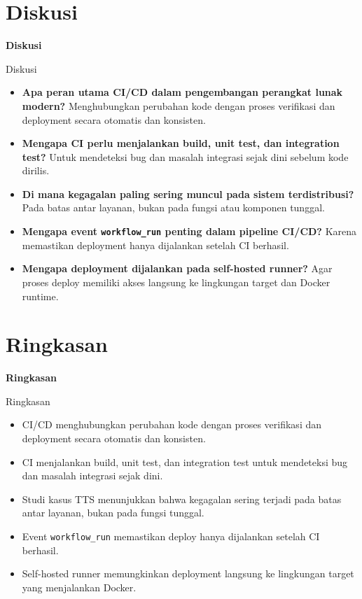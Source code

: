 \documentclass[aspectratio=169, table]{beamer}
\begin{document}
\section{Diskusi}

	\begin{frame}{\hfill}
		\centering
		\Huge{\textbf{Diskusi}}
	\end{frame}

\begin{frame}{Diskusi}
	\vspace{6pt}
	\begin{itemize}
		\item \textbf{Apa peran utama CI/CD dalam pengembangan perangkat lunak modern?}
		      Menghubungkan perubahan kode dengan proses verifikasi dan deployment secara otomatis dan konsisten.
		\item \textbf{Mengapa CI perlu menjalankan build, unit test, dan integration test?}
		      Untuk mendeteksi bug dan masalah integrasi sejak dini sebelum kode dirilis.
		\item \textbf{Di mana kegagalan paling sering muncul pada sistem terdistribusi?}
		      Pada batas antar layanan, bukan pada fungsi atau komponen tunggal.
		\item \textbf{Mengapa event \texttt{workflow\_run} penting dalam pipeline CI/CD?}
		      Karena memastikan deployment hanya dijalankan setelah CI berhasil.
		\item \textbf{Mengapa deployment dijalankan pada self-hosted runner?}
		      Agar proses deploy memiliki akses langsung ke lingkungan target dan Docker runtime.
	\end{itemize}
\end{frame}


\section{Ringkasan}

	\begin{frame}{\hfill}
		\centering
		\Huge{\textbf{Ringkasan}}
	\end{frame}

\begin{frame}{Ringkasan}
	\vspace{6pt}
	\begin{itemize}
		\item CI/CD menghubungkan perubahan kode dengan proses verifikasi dan deployment secara otomatis dan konsisten.
		\item CI menjalankan build, unit test, dan integration test untuk mendeteksi bug dan masalah integrasi sejak dini.
		\item Studi kasus TTS menunjukkan bahwa kegagalan sering terjadi pada batas antar layanan, bukan pada fungsi tunggal.
		\item Event \texttt{workflow\_run} memastikan deploy hanya dijalankan setelah CI berhasil.
		\item Self-hosted runner memungkinkan deployment langsung ke lingkungan target yang menjalankan Docker.
	\end{itemize}
\end{frame}
\end{document}
